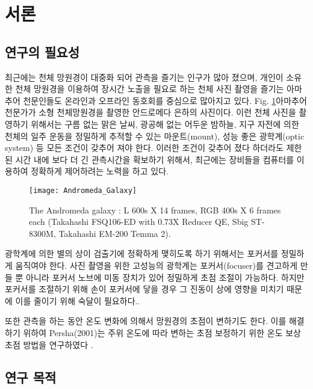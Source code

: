 \section{서론}

\subsection{연구의 필요성}

최근에는 천체 망원경이 대중화 되어 관측을 즐기는 인구가 많아 졌으며, 개인이 소유한 천체 망원경을 이용하여 장시간 노출을 필요로 하는 천체 사진 촬영을 즐기는 아마추어 천문인들도 온라인과 오프라인 동호회를 중심으로 많아지고 있다. Fig. \ref{fig:The_Andromeda_Galaxy}\은 아마추어 천문가가 소형 천체망원경을 촬영한 안드로메다 은하의 사진이다. 이런 천체 사진을 촬영하기 위해서는 구름 없는 맑은 날씨, 광공해 없는 어두운 밤하늘, 지구 자전에 의한 천체의 일주 운동을 정밀하게 추적할 수 있는 마운트(mount), 성능 좋은 광학계(optic system) 등 모든 조건이 갖추어 져야 한다. 이러한 조건이 갖추어 졌다 하더라도 제한된 시간 내에 보다 더 긴 관측시간을 확보하기 위해서, 최근에는 장비들을 컴퓨터를 이용하여 정확하게 제어하려는 노력을 하고 있다. 

\begin{figure}[H]
	\begin{center}
		\texttt{[image: Andromeda\_Galaxy]}
		\caption{The Andromeda galaxy : L 600s X 14 frames, RGB 400s X 6 frames each (Takahashi FSQ106-ED with 0.73X Reducer QE, Sbig ST-8300M, Takahashi EM-200 Temma 2).}
		\label{fig:The_Andromeda_Galaxy}
	\end{center}
\end{figure}

광학계에 의한 별의 상이 검출기에 정확하게 맺히도록 하기 위해서는 포커서를 정밀하게 움직여야 한다. 사진 촬영을 위한 고성능의 광학계는 포커서(focuser)를 견고하게 만들 뿐 아니라 포커서 노브에 미동 장치가 있어 정밀하게 초점 조절이 가능하다. 하지만 포커서를 조절하기 위해 손이 포커서에 닿을 경우 그 진동이 상에 영향을 미치기 때문에 이를 줄이기 위해 숙달이 필요하다.. 

또한 관측을 하는 동안 온도 변화에 의해서 망원경의 초점이 변하기도 한다. 이를 해결하기 위하여 Persha(2001)는 주위 온도에 따라 변하는 초점 보정하기 위한 온도 보상 초점 방법을 연구하였다 \cite{persha2001temperature}.


\subsection{연구 목적}

